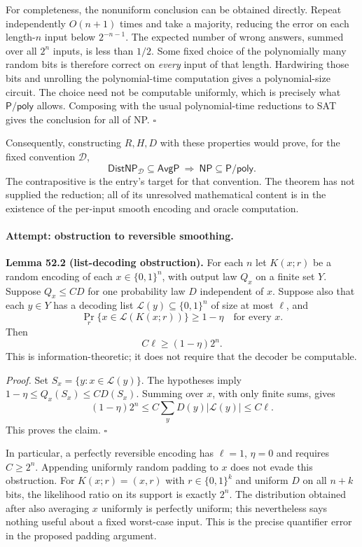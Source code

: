 \documentclass[11pt]{article}
\begin{document}
For completeness, the nonuniform conclusion can be obtained directly.
Repeat independently $O(n+1)$ times and take a majority, reducing the
error on each length-$n$ input below $2^{-n-1}$. The expected number of
wrong answers, summed over all $2^n$ inputs, is less than $1/2$. Some fixed
choice of the polynomially many random bits is therefore correct on
\emph{every} input of that length. Hardwiring those bits and unrolling the
polynomial-time computation gives a polynomial-size circuit. The choice
need not be computable uniformly, which is precisely what
$\mathsf{P/poly}$ allows. Composing with the usual polynomial-time
reductions to SAT gives the conclusion for all of NP. \hfill$\square$

Consequently, constructing $R,H,D$ with these properties would prove,
for the fixed convention $\mathcal D$,
\begin{equation}\label{ra:statement:conditional}
 \mathsf{DistNP}_{\mathcal D}\subseteq\mathsf{AvgP}
 \ \Longrightarrow\ \mathsf{NP}\subseteq\mathsf{P/poly}.
\end{equation}
The contrapositive is the entry's target for that convention. The theorem
has not supplied the reduction; all of its unresolved mathematical content
is in the existence of the per-input smooth encoding and oracle computation.

\paragraph{Attempt: obstruction to reversible smoothing.}
\textbf{Lemma 52.2 (list-decoding obstruction).} For each $n$ let $K(x;r)$
be a random encoding of each $x\in\{0,1\}^n$, with output law $Q_x$ on a
finite set $Y$. Suppose $Q_x\le C D$ for one probability law $D$ independent
of $x$. Suppose also that each $y\in Y$ has a decoding list
$\mathcal L(y)\subseteq\{0,1\}^n$ of size at most $\ell$, and
\[
 \Pr_r\{x\in\mathcal L(K(x;r))\}\ge1-\eta
 \quad\text{for every }x.
\]
Then
\begin{equation}\label{ra:statement:listbound}
 C\ell\ge (1-\eta)2^n.
\end{equation}
This is information-theoretic; it does not require that the decoder be
computable.

\textit{Proof.} Set $S_x=\{y:x\in\mathcal L(y)\}$. The hypotheses imply
$1-\eta\le Q_x(S_x)\le C D(S_x)$. Summing over $x$, with only finite sums,
gives
\[
 (1-\eta)2^n\le C\sum_y D(y)|\mathcal L(y)|\le C\ell.
\]
This proves the claim. \hfill$\square$

In particular, a perfectly reversible encoding has $\ell=1$, $\eta=0$
and requires $C\ge2^n$. Appending uniformly random padding to $x$ does
not evade this obstruction. For $K(x;r)=(x,r)$ with $r\in\{0,1\}^k$ and
uniform $D$ on all $n+k$ bits, the likelihood ratio on its support is
exactly $2^n$. The distribution obtained after also averaging $x$
uniformly is perfectly uniform; this nevertheless says nothing useful
about a fixed worst-case input. This is the precise quantifier error in
the proposed padding argument.
\end{document}
